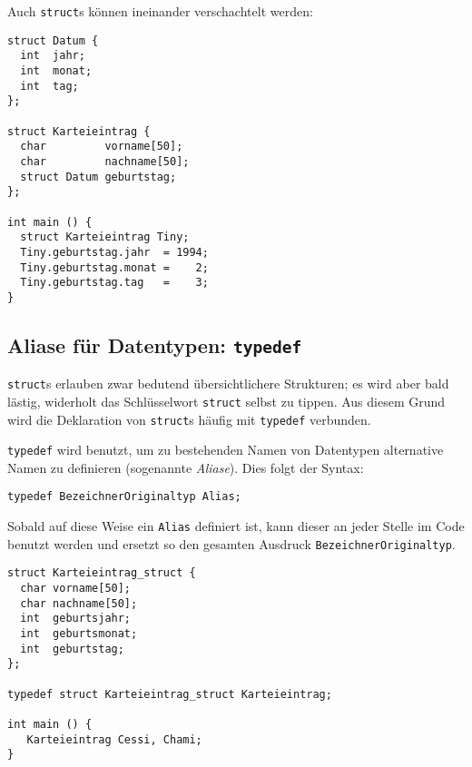 Auch \texttt{struct}s können ineinander verschachtelt werden:
\begin{codebox}
\begin{verbatim}
struct Datum {
  int  jahr;
  int  monat;
  int  tag;
};

struct Karteieintrag {
  char         vorname[50];
  char         nachname[50];
  struct Datum geburtstag;
};

int main () {
  struct Karteieintrag Tiny;
  Tiny.geburtstag.jahr  = 1994;
  Tiny.geburtstag.monat =    2;
  Tiny.geburtstag.tag   =    3;
}
\end{verbatim}
\end{codebox}

\subsection{Aliase für Datentypen: \texttt{typedef}} \label{sec:typedef}
\texttt{struct}s erlauben zwar bedutend übersichtlichere Strukturen; es wird aber bald lästig, widerholt das Schlüsselwort \texttt{struct} selbst zu tippen. Aus diesem Grund wird die Deklaration von \texttt{struct}s häufig mit \texttt{typedef} verbunden.

\texttt{typedef} wird benutzt, um zu bestehenden Namen von Datentypen alternative Namen zu definieren (sogenannte \emph{Aliase}). Dies folgt der Syntax:

\begin{codebox}
\begin{verbatim}
typedef BezeichnerOriginaltyp Alias;
\end{verbatim}
\end{codebox}

Sobald auf diese Weise ein \texttt{Alias} definiert ist, kann dieser an jeder Stelle im Code benutzt werden und ersetzt so den gesamten Ausdruck \texttt{BezeichnerOriginaltyp}.

\begin{codebox}
\begin{verbatim}
struct Karteieintrag_struct {
  char vorname[50];
  char nachname[50];
  int  geburtsjahr;
  int  geburtsmonat;
  int  geburtstag;
};

typedef struct Karteieintrag_struct Karteieintrag;

int main () {
   Karteieintrag Cessi, Chami;
}
\end{verbatim}
\end{codebox}

